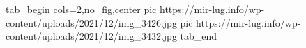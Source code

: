  
 
 
 
 


\ifcmt
  tab_begin cols=2,no_fig,center
     pic https://mir-lug.info/wp-content/uploads/2021/12/img_3426.jpg
		 pic https://mir-lug.info/wp-content/uploads/2021/12/img_3432.jpg
  tab_end
\fi
